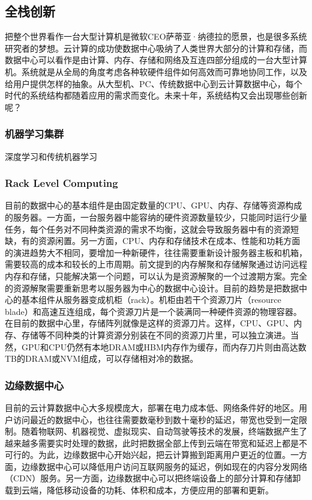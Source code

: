 \subsection{全栈创新}

把整个世界看作一台大型计算机是微软CEO萨蒂亚·纳德拉的愿景，也是很多系统研究者的梦想。云计算的成功使数据中心吸纳了人类世界大部分的计算和存储，而数据中心可以看作是由计算、内存、存储和网络及互连四部分组成的一台大型计算机。系统就是从全局的角度考虑各种软硬件组件如何高效而可靠地协同工作，以及给用户提供怎样的抽象。从大型机、PC、传统数据中心到云计算数据中心，每个时代的系统结构都随着应用的需求而变化。未来十年，系统结构又会出现哪些创新呢？

\subsubsection{机器学习集群}

深度学习和传统机器学习

\subsubsection{Rack Level Computing}

目前的数据中心的基本组件是由固定数量的CPU、GPU、内存、存储等资源构成的服务器。一方面，一台服务器中能容纳的硬件资源数量较少，只能同时运行少量任务，每个任务对不同种类资源的需求不均衡，这就会导致服务器中有的资源短缺，有的资源闲置。另一方面，CPU、内存和存储技术在成本、性能和功耗方面的演进趋势大不相同，要增加一种新硬件，往往需要重新设计服务器主板和机箱，需要较高的成本和较长的上市周期。前文提到的内存解聚和存储解聚通过访问远程内存和存储，只能解决第一个问题，可以认为是资源解聚的一个过渡期方案。完全的资源解聚需要重新思考以服务器为中心的数据中心设计。目前的趋势是把数据中心的基本组件从服务器变成机柜（rack）。机柜由若干个资源刀片（resource blade）和高速互连组成，每个资源刀片是一个装满同一种硬件资源的物理容器。在目前的数据中心里，存储阵列就像是这样的资源刀片。这样，CPU、GPU、内存、存储等不同种类的计算资源分别装在不同的资源刀片里，可以独立演进。当然，GPU和CPU仍然有本地DRAM或HBM内存作为缓存，而内存刀片则由高达数TB的DRAM或NVM组成，可以存储相对冷的数据。

\subsubsection{边缘数据中心}

目前的云计算数据中心大多规模庞大，部署在电力成本低、网络条件好的地区。用户访问最近的数据中心，也往往需要数毫秒到数十毫秒的延迟，带宽也受到一定限制。随着物联网、机器视觉、虚拟现实、自动驾驶等技术的发展，终端数据产生了越来越多需要实时处理的数据，此时把数据全部上传到云端在带宽和延迟上都是不可行的。为此，边缘数据中心开始兴起，把云计算搬到距离用户更近的位置。一方面，边缘数据中心可以降低用户访问互联网服务的延迟，例如现在的内容分发网络（CDN）服务。另一方面，边缘数据中心可以把终端设备上的部分计算和存储卸载到云端，降低移动设备的功耗、体积和成本，方便应用的部署和更新。

